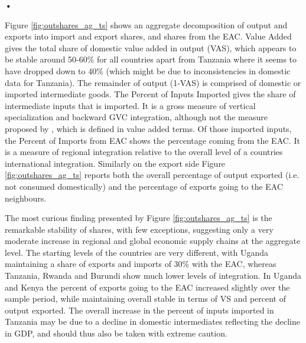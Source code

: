 \textbf{\textbf{•}}\documentclass[a4paper]{article}
\begin{document}

Figure \ref{fig:outshares_ag_ts} shows an aggregate decomposition of output and exports into import and export shares, and shares from the EAC. Value Added gives the total share of domestic value added in output (VAS), which appears to be stable around 50-60\% for all countries apart from Tanzania where it seems to have dropped down to 40\% (which might be due to inconsistencies in domestic data for Tanzania). The remainder of output (1-VAS) is comprised of domestic or imported intermediate goods. The Percent of Inputs Imported gives the share of intermediate inputs that is imported. It is a gross measure of vertical specialization and backward GVC integration, although not the measure proposed by \citet{hummels2001nature}, which is defined in value added terms. Of those imported inputs, the Percent of Imports from EAC shows the percentage coming from the EAC. It is a measure of regional integration relative to the overall level of a countries international integration.    Similarly on the export side Figure \ref{fig:outshares_ag_ts} reports both the overall percentage of output exported (i.e. not consumed domestically) and the percentage of exports going to the EAC neighbours. \newline

The most curious finding presented by Figure \ref{fig:outshares_ag_ts} is the remarkable stability of shares, with few exceptions, suggesting only a very moderate increase in regional and global economic supply chains at the aggregate level. The starting levels of the countries are very different, with Uganda maintaining a share of exports and imports of 30\% with the EAC, whereas Tanzania, Rwanda and Burundi show much lower levels of integration. In Uganda and Kenya the percent of exports going to the EAC increased slightly over the sample period, while maintaining overall stable in terms of VS and percent of output exported. The overall increase in the percent of inputs imported in Tanzania may be due to a decline in domestic intermediates reflecting the decline in GDP, and should thus also be taken with extreme caution.  

\end{document}
